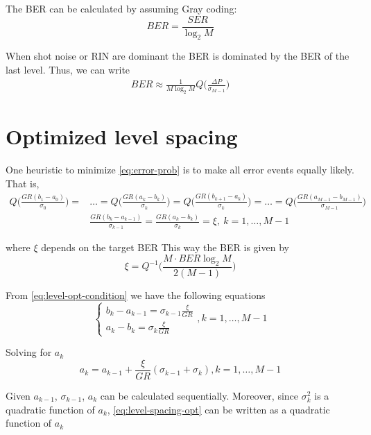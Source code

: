 \documentclass[a4paper]{article}
\begin{document}
The BER can be calculated by assuming Gray coding:
\begin{equation}
BER = \frac{SER}{\log_2 M}
\end{equation}

When shot noise or RIN are dominant the BER is dominated by the BER of the last level. Thus, we can write
\begin{align}
BER \approx \frac{1}{M\log_2 M}Q\bigg(\frac{\Delta P}{\sigma_{M-1}}\bigg)
\end{align}


\section{Optimized level spacing}

One heuristic to minimize \eqref{eq:error-prob} is to make all error events equally likely. That is,
\begin{align} \label{eq:level-opt-condition} \nonumber
Q\bigg(\frac{GR(b_1 - a_0)}{\sigma_{0}}\bigg) =& \ldots = Q\bigg(\frac{GR(a_k-b_k)}{\sigma_{k}}\bigg) = Q\bigg(\frac{GR(b_{k+1}-a_k)}{\sigma_{k}}\bigg) = \ldots = Q\bigg(\frac{GR(a_{M-1}-b_{M-1})}{\sigma_{M-1}}\bigg) \\
& \frac{GR(b_k-a_{k-1})}{\sigma_{k-1}} = \frac{GR(a_{k}-b_k)}{\sigma_{k}} = \xi,~k = 1, \ldots, M-1
\end{align}

where $\xi$ depends on the target BER 
This way the BER is given by
\begin{equation}
\xi = Q^{-1}\bigg(\frac{M\cdot BER\log_2 M}{2(M-1)}\bigg)
\end{equation}

From \eqref{eq:level-opt-condition} we have the following equations
\begin{equation}
\begin{cases}
b_k - a_{k-1} = \sigma_{k-1}\frac{\xi}{GR} \\
a_k - b_k = \sigma_{k}\frac{\xi}{GR}
\end{cases}, k = 1, \ldots, M-1
\end{equation}

Solving for $a_k$
\begin{equation} \label{eq:level-spacing-opt}
a_k = a_{k-1} + \frac{\xi}{GR}(\sigma_{k-1} + \sigma_k), k = 1, \ldots, M-1
\end{equation}

Given $a_{k-1}$, $\sigma_{k-1}$, $a_k$ can be calculated sequentially. Moreover, since $\sigma_k^2$ is a quadratic function of $a_k$, \eqref{eq:level-spacing-opt} can be written as a quadratic function of $a_k$
\end{document}
